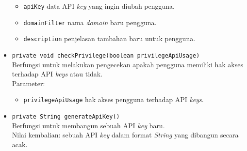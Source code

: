 \begin{itemize}
\begin{itemize}
		\item \texttt{apiKey} data API \textit{key} yang ingin diubah pengguna.
		\item \texttt{domainFilter} nama \textit{domain} baru pengguna.
		\item \texttt{description} penjelasan tambahan baru untuk pengguna.
	\end{itemize}
	\item \texttt{private void checkPrivilege(boolean privilegeApiUsage)}\\
	Berfungsi untuk melakukan pengecekan apakah pengguna memiliki hak akses terhadap API \textit{keys} atau tidak.\\
	Parameter:
	\begin{itemize}
		\item \texttt{privilegeApiUsage} hak akses pengguna terhadap API \textit{keys}.
	\end{itemize}
	\item \texttt{private String generateApiKey()}\\
	Berfungsi untuk membangun sebuah API \textit{key} baru.\\
	Nilai kembalian: sebuah API \textit{key} dalam format \textit{String} yang dibangun secara acak.
\end{itemize}

